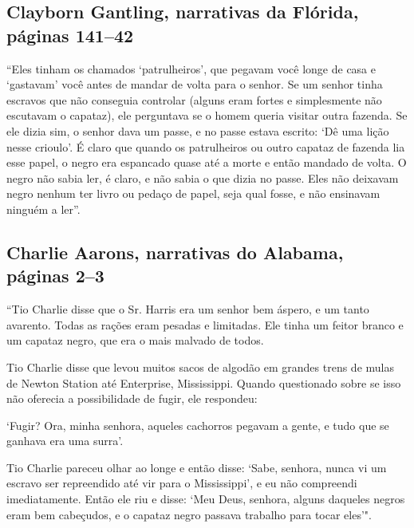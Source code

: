 \subsection{Clayborn Gantling, narrativas da Flórida, páginas 141--42} \label{ref99}

``Eles tinham os chamados `patrulheiros', que pegavam você longe de casa
e `gastavam' você antes de mandar de volta para o senhor. Se um senhor
tinha escravos que não conseguia controlar (alguns eram fortes e
simplesmente não escutavam o capataz), ele perguntava se o homem queria
visitar outra fazenda. Se ele dizia sim, o senhor dava um passe, e no
passe estava escrito: `Dê uma lição nesse crioulo'. É claro que quando
os patrulheiros ou outro capataz de fazenda lia esse papel, o negro era
espancado quase até a morte e então mandado de volta. O negro não sabia
ler, é claro, e não sabia o que dizia no passe. Eles não deixavam negro
nenhum ter livro ou pedaço de papel, seja qual fosse, e não ensinavam
ninguém a ler''.

\subsection{Charlie Aarons, narrativas do Alabama, páginas 2--3} \label{ref01}

``Tio Charlie disse que o Sr. Harris era um senhor bem áspero, e um
tanto avarento. Todas as rações eram pesadas e limitadas. Ele tinha um
feitor branco e um capataz negro, que era o mais malvado de todos.

Tio Charlie disse que levou muitos sacos de algodão em grandes trens de
mulas de Newton Station até Enterprise, Mississippi. Quando questionado
sobre se isso não oferecia a possibilidade de fugir, ele respondeu:

`Fugir? Ora, minha senhora, aqueles cachorros pegavam a gente, e tudo
que se ganhava era uma surra'.

Tio Charlie pareceu olhar ao longe e então disse: `Sabe, senhora, nunca
vi um escravo ser repreendido até vir para o Mississippi', e eu não
compreendi imediatamente. Então ele riu e disse: `Meu Deus, senhora,
alguns daqueles negros eram bem cabeçudos, e o capataz negro passava
trabalho para tocar eles'".

